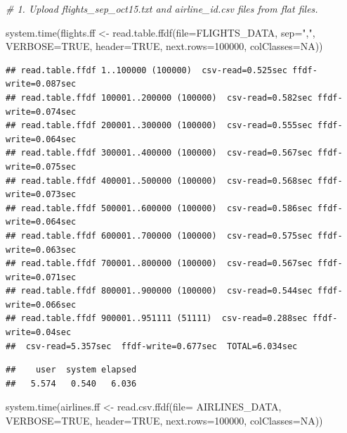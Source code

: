 \documentclass[
  12pt,
]{style/krantz}
\newenvironment{Shaded}{\begin{snugshade}}{\end{snugshade}}
\newcommand{\AttributeTok}[1]{\textcolor[rgb]{0.77,0.63,0.00}{#1}}
\newcommand{\CommentTok}[1]{\textcolor[rgb]{0.56,0.35,0.01}{\textit{#1}}}
\newcommand{\ConstantTok}[1]{\textcolor[rgb]{0.00,0.00,0.00}{#1}}
\newcommand{\DecValTok}[1]{\textcolor[rgb]{0.00,0.00,0.81}{#1}}
\newcommand{\FunctionTok}[1]{\textcolor[rgb]{0.00,0.00,0.00}{#1}}
\newcommand{\NormalTok}[1]{#1}
\newcommand{\OtherTok}[1]{\textcolor[rgb]{0.56,0.35,0.01}{#1}}
\newcommand{\StringTok}[1]{\textcolor[rgb]{0.31,0.60,0.02}{#1}}
\begin{document}
\begin{Shaded}
\begin{Highlighting}[]
\CommentTok{\# 1. Upload flights\_sep\_oct15.txt and airline\_id.csv files from flat files. }

\FunctionTok{system.time}\NormalTok{(flights.ff }\OtherTok{\textless{}{-}} \FunctionTok{read.table.ffdf}\NormalTok{(}\AttributeTok{file=}\NormalTok{FLIGHTS\_DATA,}
                                          \AttributeTok{sep=}\StringTok{","}\NormalTok{,}
                                          \AttributeTok{VERBOSE=}\ConstantTok{TRUE}\NormalTok{,}
                                          \AttributeTok{header=}\ConstantTok{TRUE}\NormalTok{,}
                                          \AttributeTok{next.rows=}\DecValTok{100000}\NormalTok{,}
                                          \AttributeTok{colClasses=}\ConstantTok{NA}\NormalTok{))}
\end{Highlighting}
\end{Shaded}

\begin{verbatim}
## read.table.ffdf 1..100000 (100000)  csv-read=0.525sec ffdf-write=0.087sec
## read.table.ffdf 100001..200000 (100000)  csv-read=0.582sec ffdf-write=0.074sec
## read.table.ffdf 200001..300000 (100000)  csv-read=0.555sec ffdf-write=0.064sec
## read.table.ffdf 300001..400000 (100000)  csv-read=0.567sec ffdf-write=0.075sec
## read.table.ffdf 400001..500000 (100000)  csv-read=0.568sec ffdf-write=0.073sec
## read.table.ffdf 500001..600000 (100000)  csv-read=0.586sec ffdf-write=0.064sec
## read.table.ffdf 600001..700000 (100000)  csv-read=0.575sec ffdf-write=0.063sec
## read.table.ffdf 700001..800000 (100000)  csv-read=0.567sec ffdf-write=0.071sec
## read.table.ffdf 800001..900000 (100000)  csv-read=0.544sec ffdf-write=0.066sec
## read.table.ffdf 900001..951111 (51111)  csv-read=0.288sec ffdf-write=0.04sec
##  csv-read=5.357sec  ffdf-write=0.677sec  TOTAL=6.034sec
\end{verbatim}

\begin{verbatim}
##    user  system elapsed 
##   5.574   0.540   6.036
\end{verbatim}

\begin{Shaded}
\begin{Highlighting}[]
\FunctionTok{system.time}\NormalTok{(airlines.ff }\OtherTok{\textless{}{-}} \FunctionTok{read.csv.ffdf}\NormalTok{(}\AttributeTok{file=}\NormalTok{ AIRLINES\_DATA,}
                             \AttributeTok{VERBOSE=}\ConstantTok{TRUE}\NormalTok{,}
                             \AttributeTok{header=}\ConstantTok{TRUE}\NormalTok{,}
                             \AttributeTok{next.rows=}\DecValTok{100000}\NormalTok{,}
                             \AttributeTok{colClasses=}\ConstantTok{NA}\NormalTok{))}
\end{Highlighting}
\end{Shaded}
\end{document}
